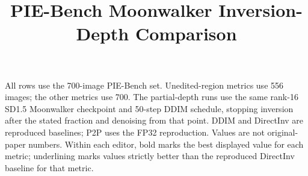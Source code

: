 \documentclass[10pt]{article}
\title{PIE-Bench Moonwalker Inversion-Depth Comparison}
\date{}
\begin{document}
\maketitle
\noindent All rows use the 700-image PIE-Bench set. Unedited-region metrics use 556 images; the other metrics use 700. The partial-depth runs use the same rank-16 SD1.5 Moonwalker checkpoint and 50-step DDIM schedule, stopping inversion after the stated fraction and denoising from that point. DDIM and DirectInv are reproduced baselines; P2P uses the FP32 reproduction. Values are not original-paper numbers. Within each editor, bold marks the best displayed value for each metric; underlining marks values strictly better than the reproduced DirectInv baseline for that metric.
\par\medskip
\begin{table}[htbp]
\centering
\scriptsize
\caption{P2P: inversion depth versus reproduced full-depth baselines. All values are means.}
\label{tab:partial-depth-p2p}
\end{table}
\end{document}

